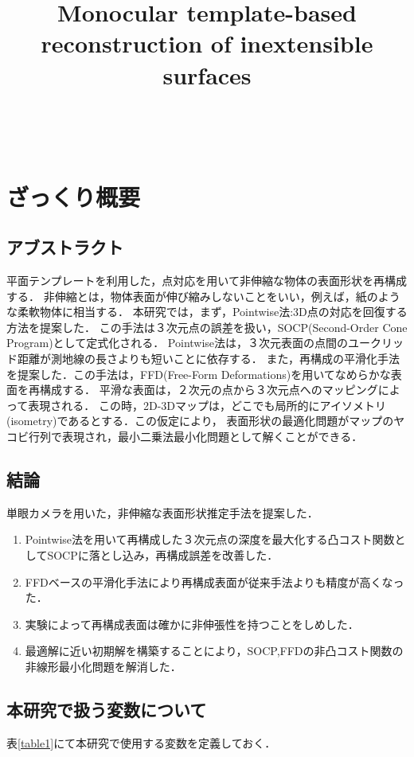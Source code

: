 \documentclass[10.5pt,twocolumn,a4j,fleqn]{ujarticle}
\title{
    {\Large{\bf Monocular template-based reconstruction of inextensible surfaces  \cite{Perriollat2011}}}
}
\author{\bf{
        
    }\\
}
\date{}
\def\tblref#1{表\ref{#1}}
\begin{document}
\maketitle

\section{ざっくり概要}\label{sec1}
\subsection{アブストラクト}
平面テンプレートを利用した，点対応を用いて非伸縮な物体の表面形状を再構成する．
非伸縮とは，物体表面が伸び縮みしないことをいい，例えば，紙のような柔軟物体に相当する．
本研究では，まず，Pointwise法:3D点の対応を回復する方法を提案した．
この手法は３次元点の誤差を扱い，SOCP(Second-Order Cone Program)として定式化される．
Pointwise法は，３次元表面の点間のユークリッド距離が測地線の長さよりも短いことに依存する．
また，再構成の平滑化手法を提案した．この手法は，FFD(Free-Form Deformations)を用いてなめらかな表面を再構成する．
平滑な表面は，２次元の点から３次元点へのマッピングによって表現される．
この時，2D-3Dマップは，どこでも局所的にアイソメトリ(isometry)であるとする．この仮定により，
表面形状の最適化問題がマップのヤコビ行列で表現され，最小二乗法最小化問題として解くことができる．

\subsection{結論}
単眼カメラを用いた，非伸縮な表面形状推定手法を提案した．
\begin{enumerate}
    \item Pointwise法を用いて再構成した３次元点の深度を最大化する凸コスト関数としてSOCPに落とし込み，再構成誤差を改善した．
    \item FFDベースの平滑化手法により再構成表面が従来手法よりも精度が高くなった．
    \item 実験によって再構成表面は確かに非伸張性を持つことをしめした．
    \item 最適解に近い初期解を構築することにより，SOCP,FFDの非凸コスト関数の非線形最小化問題を解消した．
\end{enumerate}
\subsection{本研究で扱う変数について}
\tblref{table1}にて本研究で使用する変数を定義しておく．
\end{document}
